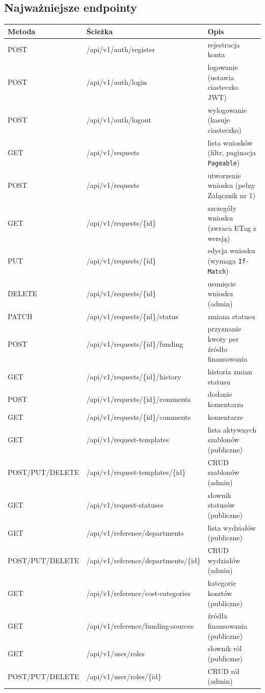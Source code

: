 \documentclass[12pt,a4paper]{article}
\begin{document}
\subsection{Najważniejsze endpointy}
\begin{tabularx}{\textwidth}{l l X}
  \toprule
  \textbf{Metoda} & \textbf{Ścieżka} & \textbf{Opis} \\
  \midrule
  POST & /api/v1/auth/register & rejestracja konta \\
  POST & /api/v1/auth/login & logowanie (ustawia ciasteczko JWT) \\
  POST & /api/v1/auth/logout & wylogowanie (kasuje ciasteczko) \\
  GET  & /api/v1/requests & lista wniosków (filtr, paginacja \texttt{Pageable}) \\
  POST & /api/v1/requests & utworzenie wniosku (pełny Załącznik nr 1) \\
  GET  & /api/v1/requests/\{id\} & szczegóły wniosku (zwraca ETag z wersją) \\
  PUT  & /api/v1/requests/\{id\} & edycja wniosku (wymaga \texttt{If-Match}) \\
  DELETE & /api/v1/requests/\{id\} & usunięcie wniosku (admin) \\
  PATCH & /api/v1/requests/\{id\}/status & zmiana statusu \\
  POST & /api/v1/requests/\{id\}/funding & przyznanie kwoty per źródło finansowania \\
  GET  & /api/v1/requests/\{id\}/history & historia zmian statusu \\
  POST & /api/v1/requests/\{id\}/comments & dodanie komentarza \\
  GET  & /api/v1/requests/\{id\}/comments & komentarze \\
  GET  & /api/v1/request-templates & lista aktywnych szablonów (publiczne) \\
  POST/PUT/DELETE & /api/v1/request-templates/\{id\} & CRUD szablonów (admin) \\
  GET  & /api/v1/request-statuses & słownik statusów (publiczne) \\
  GET  & /api/v1/reference/departments & lista wydziałów (publiczne) \\
  POST/PUT/DELETE & /api/v1/reference/departments/\{id\} & CRUD wydziałów (admin) \\
  GET  & /api/v1/reference/cost-categories & kategorie kosztów (publiczne) \\
  GET  & /api/v1/reference/funding-sources & źródła finansowania (publiczne) \\
  GET  & /api/v1/user/roles & słownik ról (publiczne) \\
  POST/PUT/DELETE & /api/v1/user/roles/\{id\} & CRUD ról (admin) \\
  \bottomrule
\end{tabularx}
\end{document}
